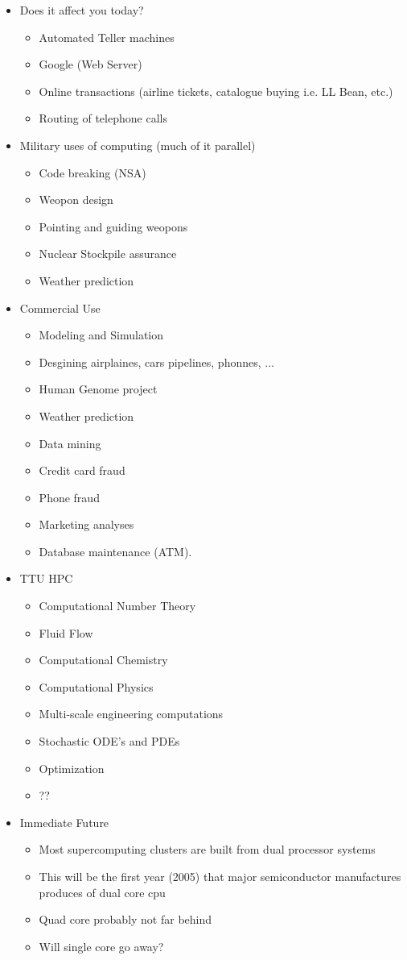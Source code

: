 \begin{itemize}
\begin{itemize}
\begin{itemize}
\end{itemize}


\end{itemize}
\item Does it affect you today?
\begin{itemize}
\item Automated Teller machines
\item Google (Web Server) 
\item Online transactions (airline tickets, catalogue buying i.e. LL Bean, etc.)
\item Routing of telephone calls
\end{itemize}
\item Military uses of computing (much of it parallel)
\begin{itemize}
\item Code breaking (NSA)
\item Weopon design 
\item Pointing and guiding weopons
\item Nuclear Stockpile assurance
\item Weather prediction
\end{itemize}
\item Commercial Use
\begin{itemize}
\item Modeling and Simulation
\item Desgining airplaines, cars pipelines, phonnes, ...
\item Human Genome project
\item Weather prediction
\item Data mining
\item Credit card fraud
\item Phone fraud
\item Marketing analyses
\item Database maintenance (ATM).
\end{itemize}
\item TTU HPC
\begin{itemize}
\item Computational Number Theory
\item Fluid Flow 
\item Computational Chemistry 
\item Computational Physics
\item Multi-scale engineering computations
\item Stochastic ODE's and PDEs
\item Optimization
\item ??
\end{itemize}
\item Immediate Future
\begin{itemize}
\item Most supercomputing clusters are built from dual processor systems
\item This will be the first year (2005) that major semiconductor manufactures produces of dual core cpu
\item Quad core probably not far behind 
\item Will single core go away?
\end{itemize}


\end{itemize}
